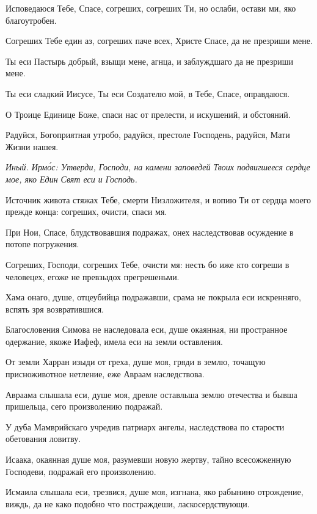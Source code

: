 Исповедаюся Тебе, Спасе, согреших, согреших Ти, но ослаби, остави ми, яко благоутробен.

Согреших Тебе един аз, согреших паче всех, Христе Спасе, да не презриши мене.

Ты еси Пастырь добрый, взыщи мене, агнца, и заблуждшаго да не презриши мене.

Ты еси сладкий Иисусе, Ты еси Создателю мой, в Тебе, Спасе, оправдаюся.


О Троице Единице Боже, спаси нас от прелести, и искушений, и обстояний.


Радуйся, Богоприятная утробо, радуйся, престоле Господень, радуйся, Мати Жизни нашея.

\itshape Иный. Ирм\'{о}с\normalfont{}: Утверди, Господи, на камени заповедей Твоих подвигшееся сердце мое, яко Един Свят еси и Господь.

Источник живота стяжах Тебе, смерти Низложителя, и вопию Ти от сердца моего прежде конца: согреших, очисти, спаси мя.

При Нои, Спасе, блудствовавшия подражах, онех наследствовав осуждение в потопе погружения.

Согреших, Господи, согреших Тебе, очисти мя: несть бо иже кто согреши в человецех, егоже не превзыдох прегрешеньми.

Хама онаго, душе, отцеубийца подражавши, срама не покрыла еси искренняго, вспять зря возвратившися.

Благословения Симова не наследовала еси, душе окаянная, ни пространное одержание, якоже Иафеф, имела еси на земли оставления.

От земли Харран изыди от греха, душе моя, гряди в землю, точащую присноживотное нетление, еже Авраам наследствова.

Авраама слышала еси, душе моя, древле оставльша землю отечества и бывша пришельца, сего произволению подражай.

У дуба Мамврийскаго учредив патриарх ангелы, наследствова по старости обетования ловитву.

Исаака, окаянная душе моя, разумевши новую жертву, тайно всесожженную Господеви, подражай его произволению.

Исмаила слышала еси, трезвися, душе моя, изгнана, яко рабынино отрождение, виждь, да не како подобно что постраждеши, ласкосердствующи.

